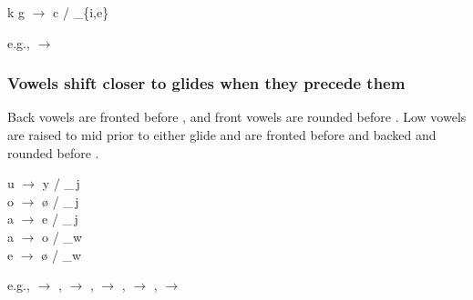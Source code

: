 \begin{center}
k g $\to$ c \paljstop{} / \_\{i,e\}
\end{center}

e.g.,   $\to$ 

\subsubsection{Vowels shift closer to glides when they precede them}

Back vowels are fronted before , and front vowels are rounded before . Low vowels are raised to mid prior to either glide and are fronted before  and backed and rounded before .

\begin{center}
    u $\to$ y / \_\,j\\
    o $\to$ ø / \_\,j\\
    a $\to$ e / \_\,j\\
    a $\to$ o / \_w\\
    e $\to$ ø / \_w
\end{center}

e.g.,   $\to$ ,   $\to$ ,   $\to$ ,   $\to$ ,   $\to$ 